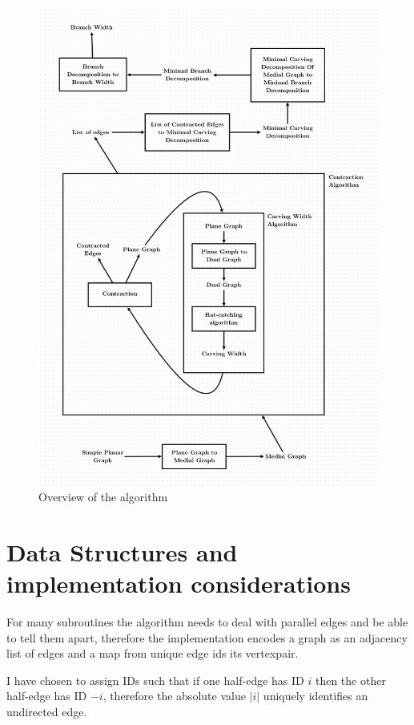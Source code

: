 \documentclass{article}
\begin{document}
	\begin{figure}[H]
		\centering
		\includegraphics[width=\textwidth]{./images/overview.png}
		\caption{Overview of the algorithm}
		\label{fig:overview}
	\end{figure}

\section{Data Structures and implementation considerations}

	For many subroutines the algorithm needs to deal with parallel edges and be able to tell them apart, therefore the implementation encodes a graph as an adjacency list of edges and a map from unique edge ids its vertexpair.

	I have chosen to assign IDs such that if one half-edge has ID $i$ then the other half-edge has ID $-i$, therefore the absolute value $|i|$ uniquely identifies an undirected edge.
\end{document}
